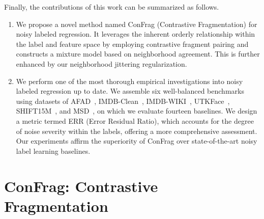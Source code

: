 \documentclass{article}
\theoremstyle{plain}
\theoremstyle{definition}
\theoremstyle{remark}
\begin{document}
Finally, the contributions of this work can be summarized as follows.
\begin{enumerate}%

\item We propose a novel method named ConFrag (Contrastive Fragmentation) for noisy labeled regression. 
    It leverages the inherent orderly relationship within the label and feature space by employing contrastive fragment pairing and constructs a mixture model based on neighborhood agreement. 
    This is further enhanced by our neighborhood jittering regularization.
\item %
    We perform one of the most thorough empirical investigations into noisy labeled regression up to date. 
    We assemble six well-balanced benchmarks using datasets of AFAD~\citep{niu16afad}, IMDB-Clean~\citep{lin2021imdbclean}, IMDB-WIKI~\citep{rothe18imdb}, UTKFace~\citep{zhifei2017utkface}, SHIFT15M~\citep{kimura21shift15m}, and MSD~\citep{bertin11msd}, on which we evaluate fourteen baselines.
    We design a metric termed ERR (Error Residual Ratio), which accounts for the degree of noise severity within the labels, offering a more comprehensive assessment.
 Our experiments affirm the superiority of ConFrag over state-of-the-art noisy label learning baselines.
\end{enumerate}


\section{ConFrag: Contrastive Fragmentation}\label{sec:fragmented_selection}
\end{document}
